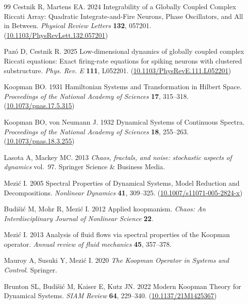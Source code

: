 \documentclass[
amsmath,amssymb,
]{revtex4-2}
\begin{document}
\begin{thebibliography}{99}
Cestnik R, Martens EA. 2024  Integrability of a Globally Coupled Complex Riccati Array: Quadratic Integrate-and-Fire Neurons, Phase Oscillators, and All in Between. {\em Physical Review Letters} \textbf{132}, 057201.
(\href{http://dx.doi.org/10.1103/PhysRevLett.132.057201}{10.1103/PhysRevLett.132.057201})

Paz\'o D, Cestnik R. 2025  Low-dimensional dynamics of globally coupled complex Riccati equations: Exact firing-rate equations for spiking neurons with clustered substructure. {\em Phys. Rev. E} \textbf{111}, L052201.
(\href{http://dx.doi.org/10.1103/PhysRevE.111.L052201}{10.1103/PhysRevE.111.L052201})

Koopman BO. 1931  Hamiltonian Systems and Transformation in Hilbert Space. {\em Proceedings of the National Academy of Sciences} \textbf{17}, 315--318.
(\href{http://dx.doi.org/10.1073/pnas.17.5.315}{10.1073/pnas.17.5.315})

Koopman BO, {von Neumann} J. 1932  Dynamical Systems of Continuous Spectra. {\em Proceedings of the National Academy of Sciences} \textbf{18}, 255--263.
(\href{http://dx.doi.org/10.1073/pnas.18.3.255}{10.1073/pnas.18.3.255})

Lasota A, Mackey MC. 2013 {\em Chaos, fractals, and noise: stochastic aspects of dynamics} vol.~97.
Springer Science \& Business Media.

Mezi{\'c} I. 2005  Spectral Properties of Dynamical Systems, Model Reduction and Decompositions. {\em Nonlinear Dynamics} \textbf{41}, 309--325.
(\href{http://dx.doi.org/10.1007/s11071-005-2824-x}{10.1007/s11071-005-2824-x})

Budi{\v{s}}i{\'c} M, Mohr R, Mezi{\'c} I. 2012  Applied koopmanism. {\em Chaos: An Interdisciplinary Journal of Nonlinear Science} \textbf{22}.

Mezi{\'c} I. 2013  Analysis of fluid flows via spectral properties of the Koopman operator. {\em Annual review of fluid mechanics} \textbf{45}, 357--378.

Mauroy A, Susuki Y, Mezi{\'c} I. 2020 {\em The {K}oopman Operator in Systems and Control}.
Springer.

Brunton SL, Budi{\v{s}}i\'{c} M, Kaiser E, Kutz JN. 2022  Modern {K}oopman Theory for Dynamical Systems. {\em SIAM Review} \textbf{64}, 229--340.
(\href{http://dx.doi.org/10.1137/21M1425367}{10.1137/21M1425367})


\end{thebibliography}
\end{document}
